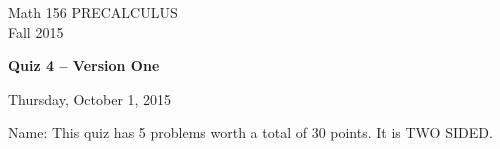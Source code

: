 \documentclass[11pt]{article}
\begin{document}
\begin{center}
\vspace{2in}

\huge{Math 156 PRECALCULUS \\
Fall 2015}

\vfill

\huge{\bf{Quiz 4 -- Version One}}\vspace{0.5in}

\large{Thursday, October 1, 2015}\\

\vfill


{\huge{Name:{\underline{\hspace{2in}}}}}
\vfill
This quiz has 5 problems worth a total of 30 points. It is TWO SIDED. 
\vfill
\end{center}
\newpage
\restoregeometry
\end{document}
